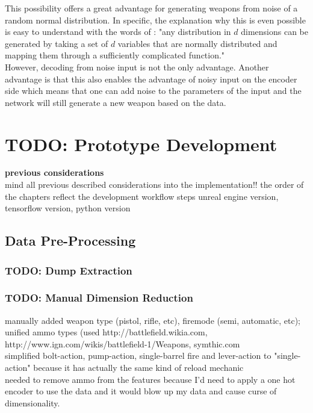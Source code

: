 \documentclass[MGS,Master,english]{twbook}%
\begin{document}
This possibility offers a great advantage for generating weapons from noise of a random normal distribution. In specific, the explanation why this is even possible is easy to understand with the words of \citep{ml::vae::tutorial}: "any distribution in $d$ dimensions can be generated by taking a set of $d$ variables that are normally distributed and mapping them through a sufficiently complicated function."\\
However, decoding from noise input is not the only advantage. Another advantage is that this also enables the advantage of noisy input on the encoder side which means that one can add noise to the parameters of the input and the network will still generate a new weapon based on the data. 


%
%
\clearpage
\chapter{TODO: Prototype Development}
\textbf{previous considerations}\\
mind all previous described considerations into the implementation!! 
the order of the chapters reflect the development workflow steps 
unreal engine version, tensorflow version, python version
\section{Data Pre-Processing}
\subsection{TODO: Dump Extraction}
\subsection{TODO: Manual Dimension Reduction}
manually added weapon type (pistol, rifle, etc), firemode (semi, automatic, etc); unified ammo types (used http://battlefield.wikia.com, http://www.ign.com/wikis/battlefield-1/Weapons, symthic.com\\
simplified bolt-action, pump-action, single-barrel fire and lever-action to "single-action" because it has actually the same kind of reload mechanic\\
needed to remove ammo from the features because I'd need to apply a one hot encoder to use the data and it would blow up my data and cause curse of dimensionality.
\end{document}
